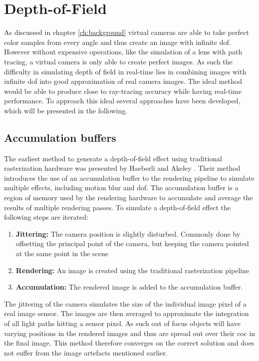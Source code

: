 \chapter{Depth-of-Field}
As discussed in chapter \ref{ch:background} virtual cameras are able to take perfect color samples from every angle and thus create an image with infinite \gls{dof}.
However without expensive operations, like the simulation of a lens with path tracing, a virtual camera is only able to create perfect images.
As such the difficulty in simulating depth of field in real-time lies in combining images with infinite \gls{dof} into good approximation of real camera images.
The ideal method would be able to produce close to ray-tracing accuracy while having real-time performance.
To approach this ideal several approaches have been developed, which will be presented in the following.

\section{Accumulation buffers}
The earliest method to generate a depth-of-field effect using traditional rasterization hardware was presented by Haeberli and Akeley \cite{Haeberli.1990}.
Their method introduces the use of an accumulation buffer to the rendering pipeline to simulate multiple effects, including motion blur and \gls{dof}.
The accumulation buffer is a region of memory used by the rendering hardware to accumulate and average the results of multiple rendering passes.
To simulate a depth-of-field effect the following steps are iterated:
\begin{enumerate}
    \item \textbf{Jittering:} The camera position is slightly disturbed. Commonly done by offsetting the principal point of the camera, but keeping the camera pointed at the same point in the scene
    \item \textbf{Rendering:} An image is created using the traditional rasterization pipeline
    \item \textbf{Accumulation:} The rendered image is added to the accumulation buffer.
\end{enumerate}
The jittering of the camera simulates the size of the individual image pixel of a real image sensor.
The images are then averaged to approximate the integration of all light paths hitting a sensor pixel.
As such out of focus objects will have varying positions in the rendered images and thus are spread out over their \gls{coc} in the final image.
This method therefore converges on the correct solution and does not suffer from the image artefacts mentioned earlier.

